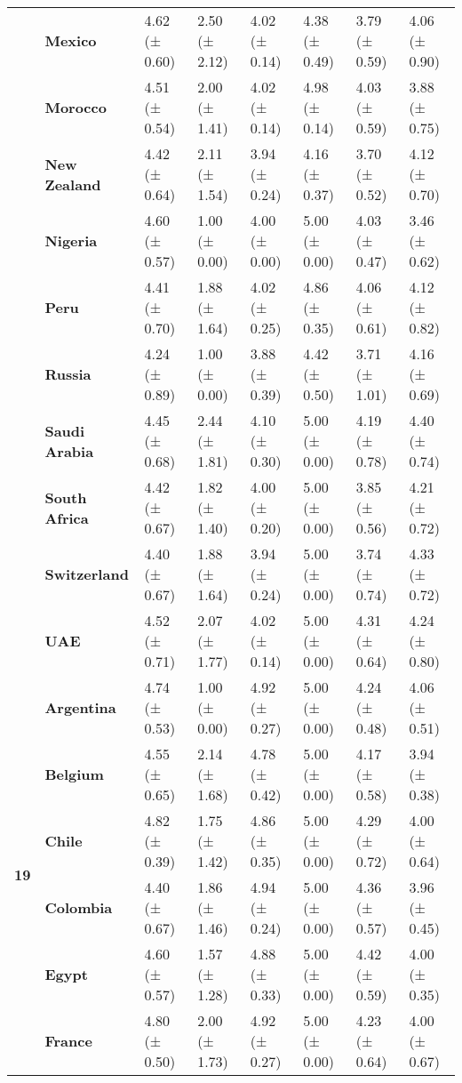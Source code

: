 \begin{longtable}{llllllll}
\textbf{} & \textbf{Mexico} & 4.62 (± 0.60) & 2.50 (± 2.12) & 4.02 (± 0.14) & 4.38 (± 0.49) & 3.79 (± 0.59) & 4.06 (± 0.90) \\
\textbf{} & \textbf{Morocco} & 4.51 (± 0.54) & 2.00 (± 1.41) & 4.02 (± 0.14) & 4.98 (± 0.14) & 4.03 (± 0.59) & 3.88 (± 0.75) \\
\textbf{} & \textbf{New Zealand} & 4.42 (± 0.64) & 2.11 (± 1.54) & 3.94 (± 0.24) & 4.16 (± 0.37) & 3.70 (± 0.52) & 4.12 (± 0.70) \\
\textbf{} & \textbf{Nigeria} & 4.60 (± 0.57) & 1.00 (± 0.00) & 4.00 (± 0.00) & 5.00 (± 0.00) & 4.03 (± 0.47) & 3.46 (± 0.62) \\
\textbf{} & \textbf{Peru} & 4.41 (± 0.70) & 1.88 (± 1.64) & 4.02 (± 0.25) & 4.86 (± 0.35) & 4.06 (± 0.61) & 4.12 (± 0.82) \\
\textbf{} & \textbf{Russia} & 4.24 (± 0.89) & 1.00 (± 0.00) & 3.88 (± 0.39) & 4.42 (± 0.50) & 3.71 (± 1.01) & 4.16 (± 0.69) \\
\textbf{} & \textbf{Saudi Arabia} & 4.45 (± 0.68) & 2.44 (± 1.81) & 4.10 (± 0.30) & 5.00 (± 0.00) & 4.19 (± 0.78) & 4.40 (± 0.74) \\
\textbf{} & \textbf{South Africa} & 4.42 (± 0.67) & 1.82 (± 1.40) & 4.00 (± 0.20) & 5.00 (± 0.00) & 3.85 (± 0.56) & 4.21 (± 0.72) \\
\textbf{} & \textbf{Switzerland} & 4.40 (± 0.67) & 1.88 (± 1.64) & 3.94 (± 0.24) & 5.00 (± 0.00) & 3.74 (± 0.74) & 4.33 (± 0.72) \\
\textbf{} & \textbf{UAE} & 4.52 (± 0.71) & 2.07 (± 1.77) & 4.02 (± 0.14) & 5.00 (± 0.00) & 4.31 (± 0.64) & 4.24 (± 0.80) \\
\cline{1-8}
\multirow[t]{19}{*}{\textbf{19}} & \textbf{Argentina} & 4.74 (± 0.53) & 1.00 (± 0.00) & 4.92 (± 0.27) & 5.00 (± 0.00) & 4.24 (± 0.48) & 4.06 (± 0.51) \\
\textbf{} & \textbf{Belgium} & 4.55 (± 0.65) & 2.14 (± 1.68) & 4.78 (± 0.42) & 5.00 (± 0.00) & 4.17 (± 0.58) & 3.94 (± 0.38) \\
\textbf{} & \textbf{Chile} & 4.82 (± 0.39) & 1.75 (± 1.42) & 4.86 (± 0.35) & 5.00 (± 0.00) & 4.29 (± 0.72) & 4.00 (± 0.64) \\
\textbf{} & \textbf{Colombia} & 4.40 (± 0.67) & 1.86 (± 1.46) & 4.94 (± 0.24) & 5.00 (± 0.00) & 4.36 (± 0.57) & 3.96 (± 0.45) \\
\textbf{} & \textbf{Egypt} & 4.60 (± 0.57) & 1.57 (± 1.28) & 4.88 (± 0.33) & 5.00 (± 0.00) & 4.42 (± 0.59) & 4.00 (± 0.35) \\
\textbf{} & \textbf{France} & 4.80 (± 0.50) & 2.00 (± 1.73) & 4.92 (± 0.27) & 5.00 (± 0.00) & 4.23 (± 0.64) & 4.00 (± 0.67) \\

\end{longtable}
